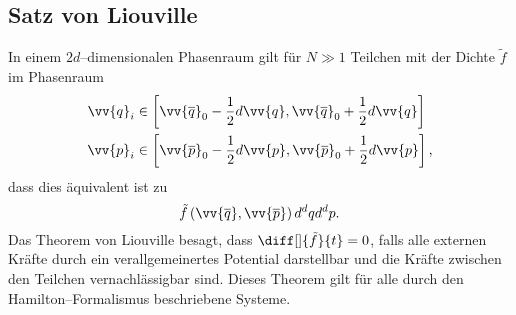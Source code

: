 \documentclass[a4paper,12pt]{article}
\numberwithin{equation}{section}
\begin{document}
\subsection{Satz von Liouville}
In einem $2d$--dimensionalen Phasenraum gilt für $N\gg 1$ Teilchen mit der Dichte $\tilde f$ im Phasenraum
\begin{align*}
        \vv{q}_i& \in \left[\vv{\overline{q}}_0-\dfrac{1}{2}d\vv{q},\vv{\overline{q}}_0+\dfrac{1}{2}d\vv{q}\right]\\
        \vv{p}_i& \in \left[\vv{\overline{p}}_0-\dfrac{1}{2}d\vv{p},\vv{\overline{p}}_0+\dfrac{1}{2}d\vv{p}\right]
,\end{align*}
dass dies äquivalent ist zu
\[ 
        \tilde f\left(\vv{\overline{q}},\vv{\overline{p}}\right)d^dqd^dp
.\] 
Das Theorem von Liouville besagt, dass $\diff[]{\tilde f}{t}=0$, falls alle externen Kräfte durch ein verallgemeinertes Potential darstellbar und die Kräfte zwischen den Teilchen vernachlässigbar sind. Dieses Theorem gilt für alle durch den Hamilton--Formalismus beschriebene Systeme.
\end{document}
